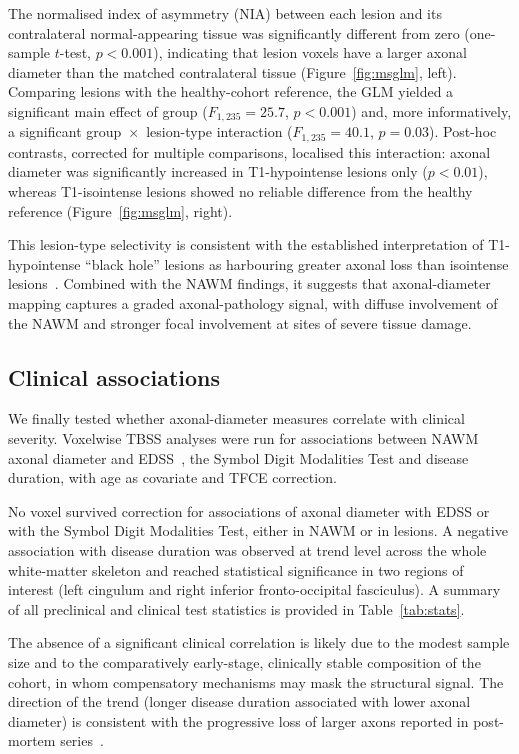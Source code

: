 \documentclass[11pt]{article}
\begin{document}
The normalised index of asymmetry (NIA) between each lesion and its contralateral normal-appearing tissue was significantly different from zero (one-sample $t$-test, $p<0.001$), indicating that lesion voxels have a larger axonal diameter than the matched contralateral tissue (Figure~\ref{fig:msglm}, left). Comparing lesions with the healthy-cohort reference, the GLM yielded a significant main effect of group ($F_{1,235}=25.7$, $p<0.001$) and, more informatively, a significant group~$\times$~lesion-type interaction ($F_{1,235}=40.1$, $p=0.03$). Post-hoc contrasts, corrected for multiple comparisons, localised this interaction: axonal diameter was significantly increased in T1-hypointense lesions only ($p<0.01$), whereas T1-isointense lesions showed no reliable difference from the healthy reference (Figure~\ref{fig:msglm}, right).

This lesion-type selectivity is consistent with the established interpretation of T1-hypointense ``black hole'' lesions as harbouring greater axonal loss than isointense lesions~\cite{vanwaesberghe1999axonal,raz2015relationship}. Combined with the NAWM findings, it suggests that axonal-diameter mapping captures a graded axonal-pathology signal, with diffuse involvement of the NAWM and stronger focal involvement at sites of severe tissue damage.

\subsection{Clinical associations}

We finally tested whether axonal-diameter measures correlate with clinical severity. Voxelwise TBSS analyses were run for associations between NAWM axonal diameter and EDSS~\cite{kurtzke1983rating}, the Symbol Digit Modalities Test and disease duration, with age as covariate and TFCE correction.

No voxel survived correction for associations of axonal diameter with EDSS or with the Symbol Digit Modalities Test, either in NAWM or in lesions. A negative association with disease duration was observed at trend level across the whole white-matter skeleton and reached statistical significance in two regions of interest (left cingulum and right inferior fronto-occipital fasciculus). A summary of all preclinical and clinical test statistics is provided in Table~\ref{tab:stats}.

The absence of a significant clinical correlation is likely due to the modest sample size and to the comparatively early-stage, clinically stable composition of the cohort, in whom compensatory mechanisms may mask the structural signal. The direction of the trend (longer disease duration associated with lower axonal diameter) is consistent with the progressive loss of larger axons reported in post-mortem series~\cite{tallantyre2010demyelinated,bergers2002axonal}.
\end{document}
